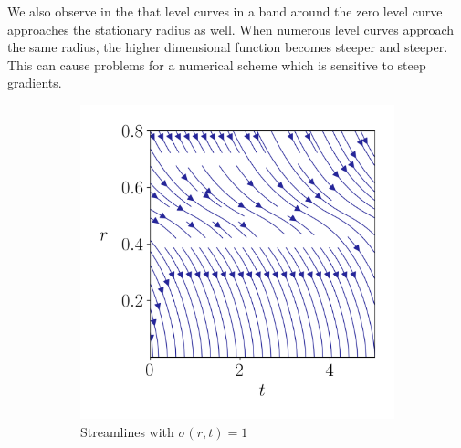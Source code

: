 We also observe in the  that level curves in a band around the zero level curve approaches the stationary radius as well. When numerous level curves approach the same radius, the higher dimensional function becomes steeper and steeper. This can cause problems for a numerical scheme which is sensitive to steep gradients.


\begin{figure}
    \begin{subfigure}{.5\linewidth}
        \centering
        \includegraphics[width=\linewidth]{figures/streamlines/mod1-a96-pos.png}
        \caption{Streamlines with $\sigma(r, t) = 1$}
        \label{fig:sub1}
        \end{subfigure}%
    \begin{subfigure}{.5\linewidth}
        \centering

\end{subfigure}
\end{figure}
